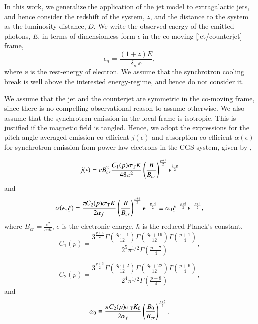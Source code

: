 In this work, we generalize the application of the jet model to extragalactic jets, and hence consider the redshift of the system, $z$, and the distance to the system as the luminosity distance, $D$. We write the observed energy of the emitted photons, $E$, in terms of dimensionless form $\epsilon$ in the co-moving [jet/counterjet] frame,
\begin{equation}
\epsilon_{n} = \frac{ (1+z) E }{ \delta_{n} \, \ee },
\label{eq:epsa_n}
\end{equation} where $\ee$ is the rest-energy of electron. We assume that the synchrotron cooling break is well above the interested energy-regime, and hence do not consider it.

We assume that the jet and the counterjet are symmetric in the co-moving frame, since there is no compelling observational reason to assume otherwise. We also assume that the synchrotron emission in the local frame is isotropic. This is justified if the magnetic field is tangled. Hence, we adopt the expressions for the pitch-angle averaged emission co-efficient $j(\epsilon)$ and absorption co-efficient $\alpha(\epsilon)$ for synchrotron emission from power-law electrons in the CGS system, given by ,

\begin{equation}
j(\epsilon) = cB_{cr}^{2} \frac{C_1(p) \sigma_{\rm{T}} K}{48\pi^2}\left(\frac{B}{B_{cr}}\right)^{\frac{p+1}{2}} \epsilon^{\frac{1-p}{2}}
\label{eq:emission_coefficient}
\end{equation}
and
\begin{equation}
\alpha(\epsilon, \xi) = \frac{\pi C_2(p) \sigma_{\rm{T}} K}{2 \alpha_f}\left(\frac{B}{B_{cr}}\right)^{\frac{p+2}{2}} \epsilon^{-\frac{p+4}{2}} \equiv \alpha_0 \, \xi^{-\frac{p+6}{2}} \epsilon^{-\frac{p+4}{2}},
\label{eq:absorption_coefficient}
\end{equation}
where $ B_{cr} = \frac{\ee^2}{c e \hbar} $, $ e $ is the electronic charge, $ \hbar $ is the reduced Planck's constant,
\begin{equation}
C_1(p) = \dfrac{ 3^{\frac{p+4}{2}} \Gamma(\frac{3p-1}{12}) \Gamma(\frac{3p+19}{12}) \Gamma(\frac{p+1}{4}) }{ 2^5 \pi^{1/2} \Gamma(\frac{p+7}{4}) },
\label{eq:C_1}
\end{equation}

\begin{equation}
C_2(p) = \dfrac{ 3^{\frac{p+3}{2}} \Gamma(\frac{3p+2}{12}) \Gamma(\frac{3p+22}{12}) \Gamma(\frac{p+6}{4}) }{ 2^4 \pi^{1/2} \Gamma(\frac{p+8}{4}) },
\label{eq:C_2}
\end{equation}
and
\begin{equation}
\alpha_0 \equiv  \frac{\pi C_2(p) \sigma_{\rm{T}} K_0}{2 \alpha_f}\left(\frac{B_0}{B_{cr}}\right)^{\frac{p+2}{2}}.
\label{eq:alphazero}
\end{equation}

